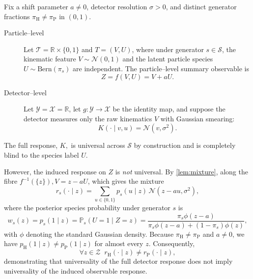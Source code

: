 \documentclass[12pt]{article}
\newcommand{\Herwig}{\mathrm{H}}
\newcommand{\Pythia}{\mathrm{P}}
\newcommand{\Prb}{\mathbb{P}}
\newcommand{\Gens}{\mathcal{S}}
\newcommand{\Normal}{\mathcal{N}}
\newcommand{\Bern}{\mathrm{Bern}}
\newcommand{\1}{\mathbbm{1}}
\renewcommand{\[}{\begin{equation}}
\renewcommand{\]}{\end{equation}}
\begin{document}
\begin{example}
    \label{ex:species}
        Fix a shift parameter \(a \ne 0\), detector resolution \(\sigma > 0\), and distinct generator fractions \(\pi_\Herwig \ne \pi_\Pythia\) in \((0, 1)\).
        \begin{description}
            \item[Particle--level] Let \(\mathcal{T} = \mathbb{R} \times \{0, 1\}\) and \(T = (V, U)\), where under generator \(s \in \Gens\), the kinematic feature \(V \sim \Normal(0, 1)\) and the latent particle species \(U \sim \Bern(\pi_s)\) are independent.
            The particle--level summary observable is
            \[
                Z = f(V, U) = V + a U.
            \]

            \item[Detector--level] Let \(\mathcal{Y} = \mathcal{X} = \mathbb{R}\), let \(g \colon \mathcal{Y} \to \mathcal{X}\) be the identity map, and suppose the detector measures only the raw kinematics \(V\) with Gaussian smearing:
            \begin{equation}
            \label{eq:species-kernel}
                K(\cdot \mid v, u) = \Normal(v, \sigma^2).
            \end{equation}
        \end{description}
        The full response, \(K,\) is universal across \(\Gens\) by construction and is completely blind to the species label \(U\).
        
        However, the induced response on \(Z\) is \emph{not} universal. By \cref{lem:mixture}, along the fibre \(f^{-1}(\{z\}), V = z - a U\), which gives the mixture
        \[
            r_s(\cdot \mid z) = \sum_{u \in \{0, 1\}} p_s(u \mid z) \, \Normal(z - a u, \sigma^2),
        \]
        where the posterior species probability under generator \(s\) is
        \[
            w_s(z) = p_s(1 \mid z) = \Prb_s(U = 1 \mid Z = z) = \frac{\pi_s \phi(z - a)}{\pi_s \phi(z - a) + (1 - \pi_s)\phi(z)},
        \]
        with \(\phi\) denoting the standard Gaussian density. Because \(\pi_\Herwig \ne \pi_\Pythia\) and \(a \ne 0\), we have \(p_\Herwig(1 \mid z) \ne p_\Pythia(1 \mid z)\) for almost every \(z\). Consequently,
        \[
            \forall z \in \mathcal{Z} \;\; r_\Herwig(\cdot \mid z) \ne r_\Pythia(\cdot \mid z),
        \]
        demonstrating that universality of the full detector response does not imply universality of the induced observable response.
    \end{example}
\end{document}
